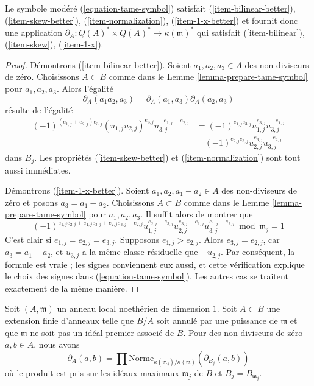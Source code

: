 \begin{lemma}
\label{lemma-tame-symbol}
Le symbole modéré (\ref{equation-tame-symbol}) satisfait
(\ref{item-bilinear-better}), (\ref{item-skew-better}),
(\ref{item-normalization}), (\ref{item-1-x-better}) et fournit donc
une application $\partial_A : Q(A)^* \times Q(A)^* \to \kappa(\mathfrak m)^*$
qui satisfait (\ref{item-bilinear}), (\ref{item-skew}), (\ref{item-1-x}).
\end{lemma}

\begin{proof}
Démontrons (\ref{item-bilinear-better}).
Soient $a_1, a_2, a_3 \in A$ des non-diviseurs de zéro.
Choisissons $A \subset B$ comme dans le Lemme \ref{lemma-prepare-tame-symbol}
pour $a_1, a_2, a_3$. Alors l'égalité
$$
\partial_A(a_1a_2, a_3) = \partial_A(a_1, a_3) \partial_A(a_2, a_3)
$$
résulte de l'égalité
$$
\begin{aligned}
(-1)^{(e_{1, j} + e_{2, j})e_{3, j}}
(u_{1, j}u_{2, j})^{e_{3, j}}u_{3, j}^{-e_{1, j} - e_{2, j}}
&= (-1)^{e_{1, j}e_{3, j}}u_{1, j}^{e_{3, j}}u_{3, j}^{-e_{1, j}} \\
&\quad (-1)^{e_{2, j}e_{3, j}}u_{2, j}^{e_{3, j}}u_{3, j}^{-e_{2, j}}
\end{aligned}
$$
dans $B_j$. Les propriétés (\ref{item-skew-better}) et
(\ref{item-normalization}) sont tout aussi immédiates.

\medskip\noindent
Démontrons (\ref{item-1-x-better}). Soient $a_1, a_2, a_1 - a_2 \in A$
des non-diviseurs de zéro et posons $a_3 = a_1 - a_2$.
Choisissons $A \subset B$ comme dans le Lemme \ref{lemma-prepare-tame-symbol}
pour $a_1, a_2, a_3$. Il suffit alors de montrer que
$$
(-1)^{e_{1, j}e_{2, j} + e_{1, j}e_{3, j} + e_{2, j}e_{3, j} + e_{2, j}}
u_{1, j}^{e_{2, j} - e_{3, j}}
u_{2, j}^{e_{3, j} - e_{1, j}}
u_{3, j}^{e_{1, j} - e_{2, j}} \bmod \mathfrak m_j = 1
$$
C'est clair si $e_{1, j} = e_{2, j} = e_{3, j}$.
Supposons $e_{1, j} > e_{2, j}$. Alors $e_{3, j} = e_{2, j}$,
car $a_3 = a_1 - a_2$, et $u_{3, j}$
a la même classe résiduelle que $-u_{2, j}$. Par conséquent,
la formule est vraie ; les signes conviennent eux aussi,
et cette vérification explique le choix des signes
dans (\ref{equation-tame-symbol}).
Les autres cas se traitent exactement de la même manière.
\end{proof}

\begin{lemma}
\label{lemma-norm-down-tame-symbol}
Soit $(A, \mathfrak m)$ un anneau local noethérien de dimension $1$.
Soit $A \subset B$ une extension finie d'anneaux telle que $B/A$
soit annulé par une puissance de $\mathfrak m$ et que $\mathfrak m$ ne soit pas
un idéal premier associé de $B$.
Pour des non-diviseurs de zéro $a, b \in A$, nous avons
$$
\partial_A(a, b) = \prod
\text{Norme}_{\kappa(\mathfrak m_j)/\kappa(\mathfrak m)}(\partial_{B_j}(a, b))
$$
où le produit est pris sur les idéaux maximaux $\mathfrak m_j$ de $B$
et $B_j = B_{\mathfrak m_j}$.
\end{lemma}

